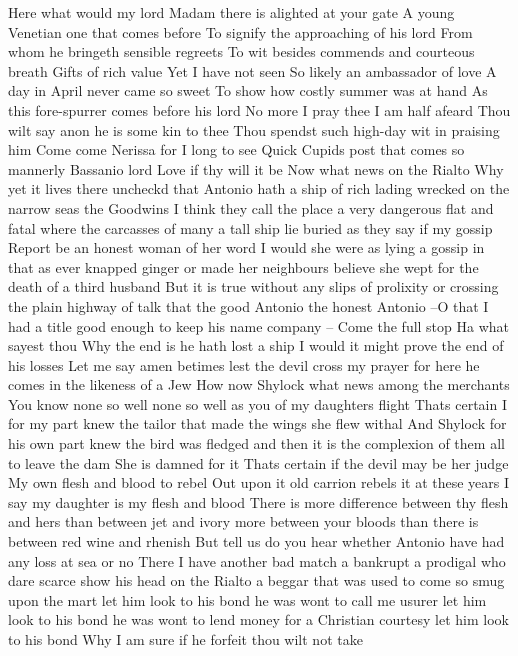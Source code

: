 Here what would my lord 
Madam there is alighted at your gate 
A young Venetian one that comes before 
To signify the approaching of his lord 
From whom he bringeth sensible regreets 
To wit besides commends and courteous breath 
Gifts of rich value Yet I have not seen 
So likely an ambassador of love 
A day in April never came so sweet 
To show how costly summer was at hand 
As this fore-spurrer comes before his lord 
No more I pray thee I am half afeard 
Thou wilt say anon he is some kin to thee 
Thou spendst such high-day wit in praising him 
Come come Nerissa for I long to see 
Quick Cupids post that comes so mannerly 
Bassanio lord Love if thy will it be 
Now what news on the Rialto 
Why yet it lives there uncheckd that Antonio hath 
a ship of rich lading wrecked on the narrow seas 
the Goodwins I think they call the place a very 
dangerous flat and fatal where the carcasses of many 
a tall ship lie buried as they say if my gossip 
Report be an honest woman of her word 
I would she were as lying a gossip in that as ever 
knapped ginger or made her neighbours believe she 
wept for the death of a third husband But it is 
true without any slips of prolixity or crossing the 
plain highway of talk that the good Antonio the 
honest Antonio --O that I had a title good enough 
to keep his name company -- 
Come the full stop 
Ha what sayest thou Why the end is he hath 
lost a ship 
I would it might prove the end of his losses 
Let me say amen betimes lest the devil cross my 
prayer for here he comes in the likeness of a Jew 
How now Shylock what news among the merchants 
You know none so well none so well as you of my 
daughters flight 
Thats certain I for my part knew the tailor 
that made the wings she flew withal 
And Shylock for his own part knew the bird was 
fledged and then it is the complexion of them all 
to leave the dam 
She is damned for it 
Thats certain if the devil may be her judge 
My own flesh and blood to rebel 
Out upon it old carrion rebels it at these years 
I say my daughter is my flesh and blood 
There is more difference between thy flesh and hers 
than between jet and ivory more between your bloods 
than there is between red wine and rhenish But 
tell us do you hear whether Antonio have had any 
loss at sea or no 
There I have another bad match a bankrupt a 
prodigal who dare scarce show his head on the 
Rialto a beggar that was used to come so smug upon 
the mart let him look to his bond he was wont to 
call me usurer let him look to his bond he was 
wont to lend money for a Christian courtesy let him 
look to his bond 
Why I am sure if he forfeit thou wilt not take 
